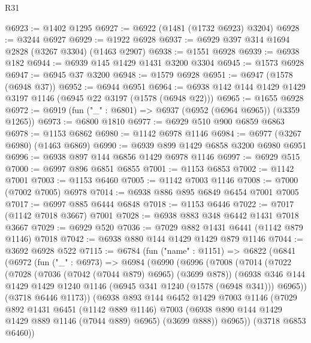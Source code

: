 \begin{lexlean}{R31}
\begin{coremodule}
@6923 := @1402 @1295
@6927 := @6922 (@1481 (@1732 @6923) @3204)
@6928 := @3244 @6927
@6929 := @1922 @6928
@6937 := @6929 @397 @314 @1694 @2828 (@3267 @3304) (@1463 @2907)
@6938 := @1551 @6928
@6939 := @6938 @182
@6944 := @6939 @145 @1429 @1431 @3200 @3304
@6945 := @1573 @6928
@6947 := @6945 @37 @3200
@6948 := @1579 @6928
@6951 := @6947 (@1578 (@6948 @37))
@6952 := @6944 @6951
@6964 := @6938 @142 @144 @1429 @1429 @3197 @1146 (@6945 @22 @3197 (@1578 (@6948 @22)))
@6965 := @1655 @6928
@6972 := @6919 (fun ("_" : @6801) => @6937 (@6952 (@6964 @6965)) (@3359 @1265))
@6973 := @6800 @1810
@6977 := @6929 @510 @900 @6859 @6863
@6978 := @1153 @6862
@6980 := @1142 @6978 @1146
@6984 := @6977 (@3267 @6980) (@1463 @6869)
@6990 := @6939 @899 @1429 @6858 @3200 @6980 @6951
@6996 := @6938 @897 @144 @6856 @1429 @6978 @1146
@6997 := @6929 @515
@7000 := @6997 @896 @6851 @6855
@7001 := @1153 @6853
@7002 := @1142 @7001
@7003 := @1153 @6460
@7005 := @1142 @7003 @1146
@7008 := @7000 (@7002 @7005) @6978
@7014 := @6938 @886 @895 @6849 @6454 @7001 @7005
@7017 := @6997 @885 @6444 @6848
@7018 := @1153 @6446
@7022 := @7017 (@1142 @7018 @3667) @7001
@7028 := @6938 @883 @348 @6442 @1431 @7018 @3667
@7029 := @6929 @520
@7036 := @7029 @882 @1431 @6441 (@1142 @879 @1146) @7018
@7042 := @6938 @880 @144 @1429 @1429 @879 @1146
@7044 := @3692 @6928 @522
@7115 := @6784
    (fun ("name" : @1151) =>
    @6822
      (@6841
        (@6972
          (fun ("_" : @6973) =>
          @6984
            (@6990
              (@6996
                (@7008
                  (@7014
                    (@7022
                      (@7028
                        (@7036 (@7042 (@7044 @879) @6965) (@3699 @878))
                        (@6938
                          @346
                          @144
                          @1429
                          @1429
                          @1240
                          @1146
                          (@6945 @341 @1240 (@1578 (@6948 @341)))
                          @6965))
                      (@3718 @6446 @1173))
                    (@6938
                      @893
                      @144
                      @6452
                      @1429
                      @7003
                      @1146
                      (@7029
                        @892
                        @1431
                        @6451
                        (@1142 @889 @1146)
                        @7003
                        (@6938 @890 @144 @1429 @1429 @889 @1146 (@7044 @889) @6965)
                        (@3699 @888))
                      @6965))
                  (@3718 @6853 @6460))

\end{coremodule}
\end{lexlean}
